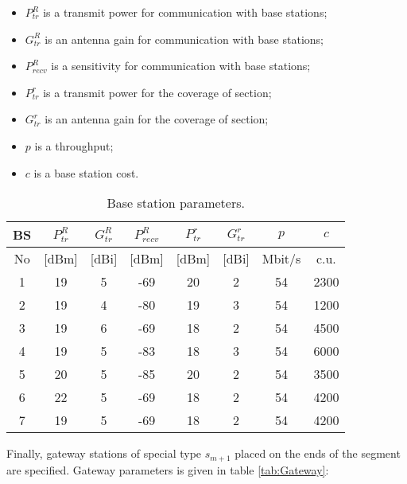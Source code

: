 \begin{itemize}
  \item $P_{tr}^R$ is a transmit power for communication with base stations;
  \item $G_{tr}^R$ is an antenna gain for communication with base stations;
  \item $P_{recv}^R$ is a sensitivity for communication with base stations;
  \item $P_{tr}^r$ is a transmit power for the coverage of section;
  \item $G_{tr}^r$ is an antenna gain for the coverage of section;
  \item $p$ is a throughput;
  \item $c$ is a base station cost.
\end{itemize}

\begin{table}[h!]\begin{center}
  \begin{tabular}{|c||c|c|c|c|c|c|c|}\hline
    BS & $P_{tr}^R$ &  $G_{tr}^R$ & $P_{recv}^R$ & $P_{tr}^r$ & $G_{tr}^r$ & $p$ & $c$ \\ \hline 
    No & [dBm] & [dBi] & [dBm] & [dBm] & [dBi] & Mbit/s & c.u.  \\ \hline
    1 & 19 & 5 & -69 & 20 & 2 & 54 & 2300 \\ 

    2 & 19 & 4 & -80 & 19 & 3 & 54 & 1200 \\ 

    3 & 19 & 6 & -69 & 18 & 2 & 54 & 4500 \\ 

    4 & 19 & 5 & -83 & 18 & 3 & 54 & 6000 \\ 

    5 & 20 & 5 & -85 & 20 & 2 & 54 & 3500 \\ 

    6 & 22 & 5 & -69 & 18 & 2 & 54 & 4200 \\ 

    7 & 19 & 5 & -69 & 18 & 2 & 54 & 4200 \\ \hline

\end{tabular}\caption{Base station parameters.}\label{tab:BS}
\end{center}\end{table}

Finally, gateway stations of special type $s_{m + 1}$ placed on the ends of the segment are specified. Gateway parameters is given in table \ref{tab:Gateway}:

